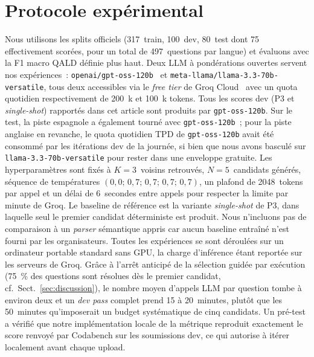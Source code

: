 \documentclass[]{ceurart}
\begin{document}
\section{Protocole expérimental}
\label{sec:setup}
Nous utilisons les splits officiels (\num{317}~train, \num{100}~dev, \num{80}~test dont 75 effectivement scorées, pour un total de \num{497}~questions par langue) et évaluons avec la F1 macro QALD définie plus haut. Deux LLM à pondérations ouvertes servent nos expériences~: \texttt{openai/gpt-oss-120b}~\cite{openai2025gptoss} et \texttt{meta-llama/llama-3.3-70b-versatile}, tous deux accessibles via le \emph{free tier} de Groq Cloud~\cite{groq2024} avec un quota quotidien respectivement de 200~k et 100~k tokens. Tous les scores dev (P3 et \emph{single-shot}) rapportés dans cet article sont produits par \texttt{gpt-oss-120b}. Sur le test, la piste espagnole a également tourné avec \texttt{gpt-oss-120b}~; pour la piste anglaise en revanche, le quota quotidien TPD de \texttt{gpt-oss-120b} avait été consommé par les itérations dev de la journée, si bien que nous avons basculé sur \texttt{llama-3.3-70b-versatile} pour rester dans une enveloppe gratuite. Les hyperparamètres sont fixés à $K=3$~voisins retrouvés, $N=5$~candidats générés, séquence de températures $(0{,}0;\,0{,}7;\,0{,}7;\,0{,}7;\,0{,}7)$, un plafond de 2048~tokens par appel et un délai de 6~secondes entre appels pour respecter la limite par minute de Groq. Le baseline de référence est la variante \emph{single-shot} de P3, dans laquelle seul le premier candidat déterministe est produit. Nous n'incluons pas de comparaison à un \emph{parser} sémantique appris car aucun baseline entraîné n'est fourni par les organisateurs. Toutes les expériences se sont déroulées sur un ordinateur portable standard sans GPU, la charge d'inférence étant reportée sur les serveurs de Groq. Grâce à l'arrêt anticipé de la sélection guidée par exécution (75~\% des questions sont résolues dès le premier candidat, cf.~Sect.~\ref{sec:discussion}), le nombre moyen d'appels LLM par question tombe à environ deux et un \emph{dev pass} complet prend 15 à 20~minutes, plutôt que les 50~minutes qu'imposerait un budget systématique de cinq candidats. Un pré-test a vérifié que notre implémentation locale de la métrique reproduit exactement le score renvoyé par Codabench sur les soumissions dev, ce qui autorise à itérer localement avant chaque upload.

\end{document}

